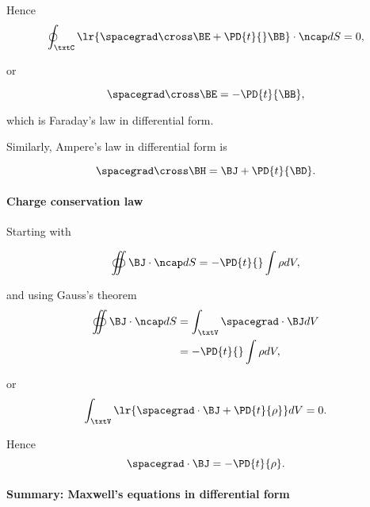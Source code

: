 Hence
\begin{equation}\label{eqn:uwavesLecture1:220}
\oint_\txtC
\lr{
\spacegrad \cross \BE
+ \PD{t}{} \BB
}
\cdot \ncap dS
= 0,
\end{equation}

or

\begin{equation}\label{eqn:uwavesLecture1:240}
\spacegrad \cross \BE = -\PD{t}{\BB},
\end{equation}

which is Faraday's law in differential form.

Similarly, Ampere's law in differential form is

\begin{equation}\label{eqn:uwavesLecture1:260}
\spacegrad \cross \BH = \BJ + \PD{t}{\BD}.
\end{equation}

\paragraph{Charge conservation law}

Starting with

\begin{equation}\label{eqn:uwavesLecture1:280}
\oiint \BJ \cdot \ncap dS = -\PD{t}{} \int \rho dV,
\end{equation}

and using Gauss's theorem
\begin{equation}\label{eqn:uwavesLecture1:300}
\begin{aligned}
\oiint  \BJ \cdot \ncap dS &= \int_\txtV \spacegrad \cdot \BJ dV \\ &=
-\PD{t}{} \int \rho dV,
\end{aligned}
\end{equation}

or
\begin{equation}\label{eqn:uwavesLecture1:320}
\int_\txtV \lr{
\spacegrad \cdot \BJ +\PD{t}{\rho }} dV = 0.
\end{equation}

Hence
\begin{equation}\label{eqn:uwavesLecture1:340}
\spacegrad \cdot \BJ = -\PD{t}{\rho}.
\end{equation}

\paragraph{Summary: Maxwell's equations in differential form}


